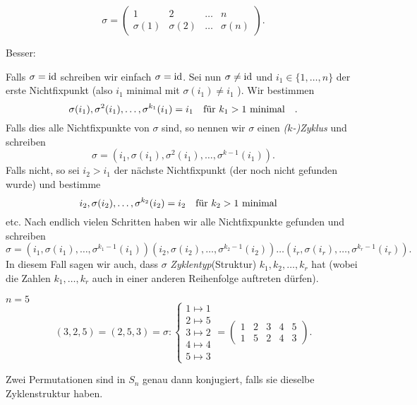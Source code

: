 \begin{notation}
	\[
	\sigma = \begin{pmatrix} 
		1 & 2 & \ldots & n\\
		\sigma(1) & \sigma(2) & \ldots & \sigma(n)
	\end{pmatrix} 
	.\] 
\end{notation}
Besser:
\begin{notation}
	Falls $\sigma = \operatorname{id}$ schreiben wir einfach $\sigma = \operatorname{id}$.
	Sei nun $\sigma \neq \operatorname{id}$ und $i_1 \in \{1,\ldots,n\} $ der erste Nichtfixpunkt (also $i_{1}$ minimal mit $\sigma(i_1) \neq i_1$ ).
	Wir bestimmen
	\[
		\sigma(i_1) , \sigma^2(i_1),\ldots, \sigma^{k_1}(i_1) = i_1 \qq{für $k_1 > 1$ minimal}
	.\] 
	Falls dies alle Nichtfixpunkte von $\sigma$ sind, so nennen wir $\sigma$ einen \emph{($k$-)Zyklus} und schreiben
	 \[
		 \sigma = (i_1,\sigma(i_1),\sigma^2(i_1),\ldots,\sigma^{k-1}(i_1))
	.\] 
	Falls nicht, so sei $i_2 > i_1$ der nächste Nichtfixpunkt (der noch nicht gefunden wurde) und bestimme
	\[
		i_2, \sigma(i_2),\ldots, \sigma^{k_2}(i_2) = i_2 \qq{für $k_2 > 1$ minimal}
	\]
	etc. Nach endlich vielen Schritten haben wir alle Nichtfixpunkte gefunden  und schreiben 
	 \[
		 \sigma = (i_1,\sigma(i_1),\ldots,\sigma^{k_1-1}(i_1))(i_2,\sigma(i_2),\ldots,\sigma^{k_2-1}(i_2))\ldots(i_{r},\sigma(i_{r}),\ldots,\sigma^{k_{r}-1}(i_{r}))
	.\] 
	In diesem Fall sagen wir auch, dass $\sigma$ \emph{Zyklentyp}(Struktur) $k_1,k_2,\ldots,k_{r}$ hat (wobei
	die Zahlen $k_1,\ldots,k_{r}$ auch in einer anderen Reihenfolge auftreten dürfen).
\end{notation}

\begin{eg}
	$n = 5$
	\[
		(3,2,5) = (2,5,3) = \sigma : \begin{cases}
			1 \mapsto  1\\ 2 \mapsto  5\\ 3 \mapsto  2\\ 4 \mapsto 4\\ 5 \mapsto 3
		\end{cases} = \begin{pmatrix} 
			1 & 2 & 3 & 4 & 5\\
			1 & 5 & 2 & 4 & 3
		\end{pmatrix} 
	.\] 
\end{eg}

\begin{proposition}
	Zwei Permutationen sind in $S_{n}$ genau dann konjugiert, falls sie dieselbe Zyklenstruktur haben.
\end{proposition}

